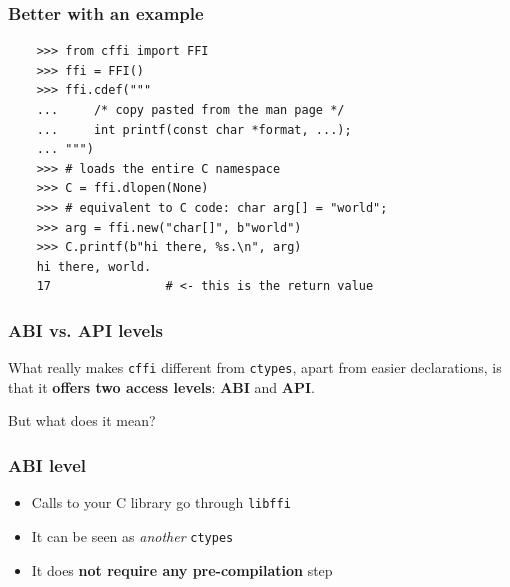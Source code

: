 \documentclass{beamer}
\begin{document}
\begin{frame}[fragile]
  \frametitle{Better with an example}

  \begin{verbatim}
    >>> from cffi import FFI
    >>> ffi = FFI()
    >>> ffi.cdef("""
    ...     /* copy pasted from the man page */
    ...     int printf(const char *format, ...);
    ... """)
    >>> # loads the entire C namespace
    >>> C = ffi.dlopen(None)
    >>> # equivalent to C code: char arg[] = "world";
    >>> arg = ffi.new("char[]", b"world")
    >>> C.printf(b"hi there, %s.\n", arg)
    hi there, world.
    17                # <- this is the return value
  \end{verbatim}
\end{frame}

\begin{frame}
  \frametitle{ABI vs. API levels}

  What really makes \texttt{cffi} different from \texttt{ctypes}, apart from
  easier declarations, is that it \textbf{offers two access levels}:
  \textbf{ABI} and \textbf{API}.

  \begin{center}
    \Huge But what does it mean?
  \end{center}
\end{frame}

\begin{frame}
  \frametitle{ABI level}

  \begin{itemize}
    \item<1-> Calls to your C library go through \texttt{libffi}
    \item<2-> It can be seen as \textit{another} \texttt{ctypes}
    \item<3-> It does \textbf{not require any pre-compilation} step
  \end{itemize}

\end{frame}
\end{document}
